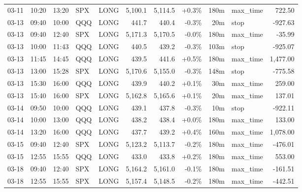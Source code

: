 \documentclass[11pt,a4paper,twoside]{article}
\begin{document}
\begin{center}
\begin{longtable}{>{\color{txtmain}}l l l l l r r r r >{\color{txtmain}}l r}
03-11 & 10:20 & 13:20 & SPX & LONG & 5,100.1 & 5,114.5 & \textcolor{wingreen}{+0.3\%} & 180m & max\_time & \textcolor{wingreen}{722.50} \\
03-13 & 09:40 & 10:00 & QQQ & LONG & 441.7 & 440.4 & \textcolor{lossred}{-0.3\%} & 20m & stop & \textcolor{lossred}{-927.63} \\
03-13 & 09:40 & 12:40 & SPX & LONG & 5,171.3 & 5,170.5 & \textcolor{lossred}{-0.0\%} & 180m & max\_time & \textcolor{lossred}{-35.99} \\
03-13 & 10:00 & 11:43 & QQQ & LONG & 440.5 & 439.2 & \textcolor{lossred}{-0.3\%} & 103m & stop & \textcolor{lossred}{-925.07} \\
03-13 & 11:45 & 14:45 & QQQ & LONG & 439.5 & 441.6 & \textcolor{wingreen}{+0.5\%} & 180m & max\_time & \textcolor{wingreen}{1,477.00} \\
03-13 & 13:00 & 15:28 & SPX & LONG & 5,170.6 & 5,155.0 & \textcolor{lossred}{-0.3\%} & 148m & stop & \textcolor{lossred}{-775.58} \\
03-13 & 15:30 & 16:00 & QQQ & LONG & 439.9 & 440.2 & \textcolor{wingreen}{+0.1\%} & 30m & max\_time & \textcolor{wingreen}{259.00} \\
03-13 & 15:40 & 16:00 & SPX & LONG & 5,162.8 & 5,165.6 & \textcolor{wingreen}{+0.1\%} & 20m & max\_time & \textcolor{wingreen}{137.01} \\
03-14 & 09:50 & 10:00 & QQQ & LONG & 439.1 & 437.8 & \textcolor{lossred}{-0.3\%} & 10m & stop & \textcolor{lossred}{-922.11} \\
03-14 & 10:00 & 13:00 & QQQ & LONG & 438.2 & 438.4 & \textcolor{wingreen}{+0.0\%} & 180m & max\_time & \textcolor{wingreen}{133.00} \\
03-14 & 13:20 & 16:00 & QQQ & LONG & 437.7 & 439.2 & \textcolor{wingreen}{+0.4\%} & 160m & max\_time & \textcolor{wingreen}{1,078.00} \\
03-15 & 09:40 & 12:40 & SPX & LONG & 5,123.2 & 5,113.7 & \textcolor{lossred}{-0.2\%} & 180m & max\_time & \textcolor{lossred}{-476.01} \\
03-15 & 12:55 & 15:55 & QQQ & LONG & 433.0 & 433.8 & \textcolor{wingreen}{+0.2\%} & 180m & max\_time & \textcolor{wingreen}{553.00} \\
03-18 & 09:40 & 12:40 & SPX & LONG & 5,164.2 & 5,161.0 & \textcolor{lossred}{-0.1\%} & 180m & max\_time & \textcolor{lossred}{-161.51} \\
03-18 & 12:55 & 15:55 & SPX & LONG & 5,157.4 & 5,148.5 & \textcolor{lossred}{-0.2\%} & 180m & max\_time & \textcolor{lossred}{-442.51} \\

\end{longtable}
\end{center}
\end{document}
